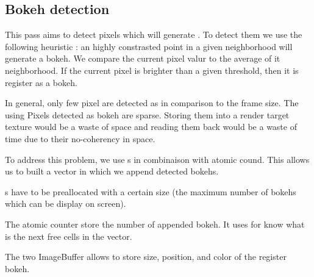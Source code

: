 \subsection{Bokeh detection}
This pass aims to detect pixels which will generate \bokehs. To detect them we use the following heuristic : an highly constrasted point in a given neighborhood will generate a bokeh.
We compare the current pixel valur to the average of it neighborhood. If the current pixel is brighter than a given threshold, then it is register as a bokeh.

In general, only few pixel are detected as \bokeh in comparison to the frame size. The using 
Pixels detected as bokeh are sparse. Storing them into a render target texture would be a waste of space and reading them back would be a waste of time due to their no-coherency in space.

To address this problem, we use \opengl {}s in combinaison with atomic cound. This allows us to built a vector in which we append detected bokehs.

s have to be preallocated with a certain size (\ie the maximum number of bokehs which can be display on screen).

The atomic counter store the number of appended bokeh. It uses for know what is the next free cells in the vector.

The two ImageBuffer allows to store size, position, and color of the register bokeh. 


